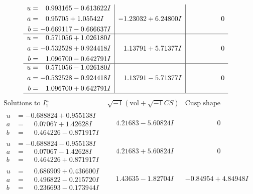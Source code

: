 \documentclass[1p]{elsarticle_modified}
\theoremstyle{definition}
\newcommand{\I}{\sqrt{-1}}
\begin{document}
$$\begin{array}{c|c|c}
\begin{aligned}
u &= \phantom{-}0.993165 - 0.613622 I \\
a &= \phantom{-}0.95705 + 1.05542 I \\
b &= -0.669117 - 0.666637 I\end{aligned}
 & -1.23032 + 6.24800 I & \phantom{-0.000000 } 0 \\ \hline\begin{aligned}
u &= \phantom{-}0.571056 + 1.026180 I \\
a &= -0.532528 + 0.924418 I \\
b &= \phantom{-}1.096700 - 0.642791 I\end{aligned}
 & \phantom{-}1.13791 + 5.71377 I & \phantom{-0.000000 } 0 \\ \hline\begin{aligned}
u &= \phantom{-}0.571056 - 1.026180 I \\
a &= -0.532528 - 0.924418 I \\
b &= \phantom{-}1.096700 + 0.642791 I\end{aligned}
 & \phantom{-}1.13791 - 5.71377 I & \phantom{-0.000000 } 0\\
 \hline 
 \end{array}$$\newpage$$\begin{array}{c|c|c}  
\text{Solutions to }I^u_{1}& \I (\text{vol} + \sqrt{-1}CS) & \text{Cusp shape}\\
 \hline 
\begin{aligned}
u &= -0.688824 + 0.955138 I \\
a &= \phantom{-}0.07067 + 1.42628 I \\
b &= \phantom{-}0.464226 - 0.871917 I\end{aligned}
 & \phantom{-}4.21683 - 5.60824 I & \phantom{-0.000000 } 0 \\ \hline\begin{aligned}
u &= -0.688824 - 0.955138 I \\
a &= \phantom{-}0.07067 - 1.42628 I \\
b &= \phantom{-}0.464226 + 0.871917 I\end{aligned}
 & \phantom{-}4.21683 + 5.60824 I & \phantom{-0.000000 } 0 \\ \hline\begin{aligned}
u &= \phantom{-}0.686909 + 0.436600 I \\
a &= \phantom{-}0.496822 - 0.215720 I \\
b &= \phantom{-}0.236693 - 0.173944 I\end{aligned}
 & \phantom{-}1.43635 - 1.82704 I & -0.84954 + 4.84948 I \\ \hline\begin{aligned}

\end{aligned}
\end{array}$$
\end{document}
